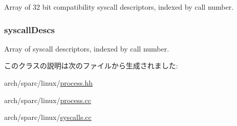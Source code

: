 \label{classSparcISA_1_1SparcLinuxProcess_a4b8a4b07a602fcc993b7f31369190958}
Array of 32 bit compatibility syscall descriptors, indexed by call number. \hypertarget{classSparcISA_1_1SparcLinuxProcess_a08d67a94820b75842e07f030e548372e}{
\subsubsection[{syscallDescs}]{ {\bf syscallDescs}}}
\label{classSparcISA_1_1SparcLinuxProcess_a08d67a94820b75842e07f030e548372e}


Array of syscall descriptors, indexed by call number. 

このクラスの説明は次のファイルから生成されました:\begin{DoxyCompactItemize}
\item 
arch/sparc/linux/\hyperlink{arch_2sparc_2linux_2process_8hh}{process.hh}\item 
arch/sparc/linux/\hyperlink{arch_2sparc_2linux_2process_8cc}{process.cc}\item 
arch/sparc/linux/\hyperlink{sparc_2linux_2syscalls_8cc}{syscalls.cc}\end{DoxyCompactItemize}

